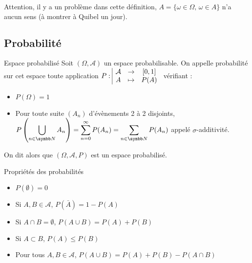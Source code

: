 Attention, il y a un problème dans cette définition, $A = \{ \omega \in \Omega, \, \omega \in A\}$ 
n'a aucun sens (à montrer à Quibel un jour).

\subsection{Probabilité}

\begin{definition}{Espace probabilisé}{}
    Soit $(\Omega, \mathcal A)$ un espace probabilisable. On appelle probabilité 
    sur cet espace toute application $P: \space \begin{array}{|ccc} \displaystyle \mathcal A & \to & \displaystyle [0, 1] \\ \displaystyle A & \mapsto & \displaystyle P(A) \end{array}$
    vérifiant :
    \begin{itemize}
        \item $P(\Omega) = 1$
        \item Pour toute suite $(A_n)$ d'évènements 2 à 2 disjoints, 
        $\displaystyle P\left( \bigcup_{n \in \N} A_n \right) = \sum_{n = 0 }^{\infty    } P(A_n ) = \sum_{n \in \N    } P(A_n)$
        appelé $\sigma$-additivité.
    \end{itemize}

    On dit alors que $(\Omega, \mathcal A, P)$ est un espace probabilisé. 
\end{definition}

\begin{proposition}{Propriétés des probabilités}{}
    \begin{itemize}
        \item $P(\emptyset) = 0$
        \item Si $A, B \in \mathcal A$, $P(\bar A) = 1 - P(A)$
        \item Si $A \cap B = \emptyset$, $P(A \cup B) = P(A) + P(B)$
        \item Si $A \subset B$, $P(A) \leqslant P(B)$
        \item Pour tous $A, B \in \mathcal A$, $P(A \cup B) = P(A) + P(B) - P(A \cap B)$
    \end{itemize}
\end{proposition}

